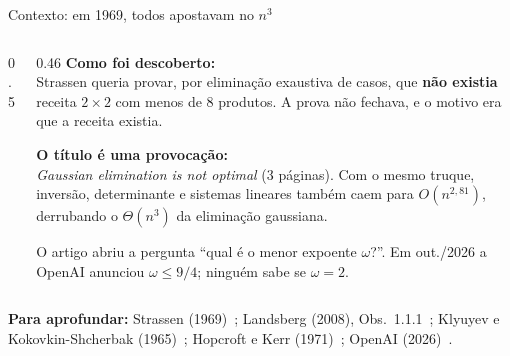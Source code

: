 \documentclass[aspectratio=169,xcolor=table]{beamer}
\newcommand{\fonte}[1]{%
  \vfill
  {\tiny\color{gray!55!black}\textbf{Para aprofundar:} #1\par}%
}
\begin{document}
\begin{frame}{Contexto: em 1969, todos apostavam no $n^3$}
  \begin{columns}[T]
    \begin{column}{0.5\textwidth}
      \centering
    \end{column}
    \begin{column}{0.46\textwidth}
      \textbf{Como foi descoberto:}\\
      \scriptsize Strassen queria provar, por eliminação exaustiva de casos, que
      \textbf{não existia} receita $2\times2$ com menos de 8 produtos. A prova não fechava,
      e o motivo era que a receita existia.
      \medskip

      \textbf{O título é uma provocação:}\\
      \scriptsize \emph{Gaussian elimination is not optimal} (3 páginas). Com o mesmo truque,
      inversão, determinante e sistemas lineares também caem para $O(n^{2{,}81})$,
      derrubando o $\Theta(n^3)$ da eliminação gaussiana.
      \medskip

      \scriptsize O artigo abriu a pergunta ``qual é o menor expoente $\omega$?''.
      Em out./2026 a OpenAI anunciou $\omega\le 9/4$; ninguém sabe se $\omega=2$.
    \end{column}
  \end{columns}
  \fonte{Strassen (1969)~\cite{strassen1969gaussian};
    Landsberg (2008), Obs.~1.1.1~\cite{landsberg2008geometry};
    Klyuyev e Kokovkin-Shcherbak (1965)~\cite{klyuyev1965minimization};
    Hopcroft e Kerr (1971)~\cite{hopcroft1971minimizing};
    OpenAI (2026)~\cite{openai2026ninefourths}.}
\end{frame}
\end{document}
